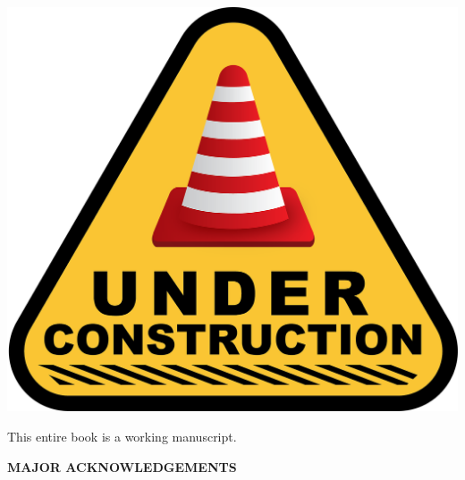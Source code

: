 \documentclass[letter,12pt]{book}
\renewcommand{\0}{\mathbf{0}}
\begin{document}




%	
%	
%
%	
	\begin{center}
\href{https://pixabay.com/illustrations/under-construction-construction-sign-2408060/}{\includegraphics[scale = 0.1]{optimization/figures/under-construction-2408060_1280}}
\end{center}

This entire book is a working manuscript. 

\begin{center}
\fontsize{14pt}{16pt}\selectfont\textcolor{titletextcolour}{\textbf{MAJOR ACKNOWLEDGEMENTS}}
\end{center}
\end{document}
